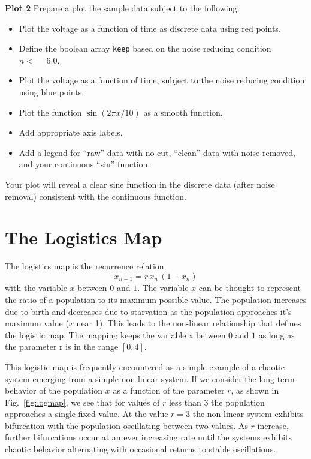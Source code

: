 {\bf Plot 2} Prepare a plot the sample data subject to the following:
\begin{itemize}
 \item Plot the voltage as a function of time as discrete data using red points.
 \item Define the boolean array {\tt keep} based on the noise reducing condition $n<=6.0$.
 \item Plot the voltage as a function of time, subject to the noise reducing condition using blue points.
 \item Plot the function $\sin(2 \pi x / 10)$ as a smooth function.
 \item Add appropriate axis labels.
 \item Add a legend for ``raw'' data with no cut, ``clean'' data with noise removed, and your continuous ``sin'' function.   
\end{itemize}
Your plot will reveal a clear sine function in the discrete data (after noise removal) consistent with the continuous function.

\section{The Logistics Map}
The logistics map is the recurrence relation
\begin{displaymath}
x_{n+1} = r \, x_n \, (1 - x_n)
\end{displaymath}
with the variable $x$ between $0$ and $1$.  The variable $x$ can be thought to represent the ratio of a population to its maximum possible value.  The population increases due to birth and decreases due to starvation as the population approaches it's maximum value ($x$ near 1).  This leads to the non-linear relationship that defines the logistic map.   The mapping keeps the variable x between $0$ and $1$ as long as the parameter r is in the range $[0,4]$.

This logistic map is frequently encountered as a simple example of a chaotic system emerging from a simple non-linear system.  If we consider the long term behavior of the population $x$ as a function of the parameter $r$, as shown in Fig.~\ref{fig:logmap}, we see that for values of $r$ less than $3$ the population approaches a single fixed value.  At the value $r=3$ the non-linear system exhibits bifurcation with the population oscillating between two values.  As $r$ increase, further bifurcations occur at an ever increasing rate until the systems exhibits chaotic behavior alternating with occasional returns to stable oscillations.

